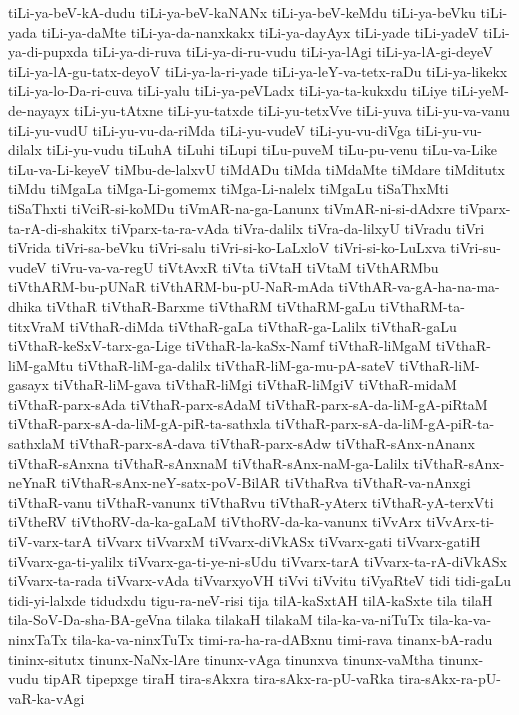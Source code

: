 {tiLi-ya-beV-kA-dudu
tiLi-ya-beV-kaNANx
tiLi-ya-beV-keMdu
tiLi-ya-beVku
tiLi-yada
tiLi-ya-daMte
tiLi-ya-da-nanxkakx
tiLi-ya-dayAyx
tiLi-yade
tiLi-yadeV
tiLi-ya-di-pupxda
tiLi-ya-di-ruva
tiLi-ya-di-ru-vudu
tiLi-ya-lAgi
tiLi-ya-lA-gi-deyeV
tiLi-ya-lA-gu-tatx-deyoV
tiLi-ya-la-ri-yade
tiLi-ya-leY-va-tetx-raDu
tiLi-ya-likekx
tiLi-ya-lo-Da-ri-cuva
tiLi-yalu
tiLi-ya-peVLadx
tiLi-ya-ta-kukxdu
tiLiye
tiLi-yeM-de-nayayx
tiLi-yu-tAtxne
tiLi-yu-tatxde
tiLi-yu-tetxVve
tiLi-yuva
tiLi-yu-va-vanu
tiLi-yu-vudU
tiLi-yu-vu-da-riMda
tiLi-yu-vudeV
tiLi-yu-vu-diVga
tiLi-yu-vu-dilalx
tiLi-yu-vudu
tiLuhA
tiLuhi
tiLupi
tiLu-puveM
tiLu-pu-venu
tiLu-va-Like
tiLu-va-Li-keyeV
tiMbu-de-lalxvU
tiMdADu
tiMda
tiMdaMte
tiMdare
tiMditutx
tiMdu
tiMgaLa
tiMga-Li-gomemx
tiMga-Li-nalelx
tiMgaLu
tiSaThxMti
tiSaThxti
tiVciR-si-koMDu
tiVmAR-na-ga-Lanunx
tiVmAR-ni-si-dAdxre
tiVparx-ta-rA-di-shakitx
tiVparx-ta-ra-vAda
tiVra-dalilx
tiVra-da-lilxyU
tiVradu
tiVri
tiVrida
tiVri-sa-beVku
tiVri-salu
tiVri-si-ko-LaLxloV
tiVri-si-ko-LuLxva
tiVri-su-vudeV
tiVru-va-va-regU
tiVtAvxR
tiVta
tiVtaH
tiVtaM
tiVthARMbu
tiVthARM-bu-pUNaR
tiVthARM-bu-pU-NaR-mAda
tiVthAR-va-gA-ha-na-ma-dhika
tiVthaR
tiVthaR-Barxme
tiVthaRM
tiVthaRM-gaLu
tiVthaRM-ta-titxVraM
tiVthaR-diMda
tiVthaR-gaLa
tiVthaR-ga-Lalilx
tiVthaR-gaLu
tiVthaR-keSxV-tarx-ga-Lige
tiVthaR-la-kaSx-Namf
tiVthaR-liMgaM
tiVthaR-liM-gaMtu
tiVthaR-liM-ga-dalilx
tiVthaR-liM-ga-mu-pA-sateV
tiVthaR-liM-gasayx
tiVthaR-liM-gava
tiVthaR-liMgi
tiVthaR-liMgiV
tiVthaR-midaM
tiVthaR-parx-sAda
tiVthaR-parx-sAdaM
tiVthaR-parx-sA-da-liM-gA-piRtaM
tiVthaR-parx-sA-da-liM-gA-piR-ta-sathxla
tiVthaR-parx-sA-da-liM-gA-piR-ta-sathxlaM
tiVthaR-parx-sA-dava
tiVthaR-parx-sAdw
tiVthaR-sAnx-nAnanx
tiVthaR-sAnxna
tiVthaR-sAnxnaM
tiVthaR-sAnx-naM-ga-Lalilx
tiVthaR-sAnx-neYnaR
tiVthaR-sAnx-neY-satx-poV-BilAR
tiVthaRva
tiVthaR-va-nAnxgi
tiVthaR-vanu
tiVthaR-vanunx
tiVthaRvu
tiVthaR-yAterx
tiVthaR-yA-terxVti
tiVtheRV
tiVthoRV-da-ka-gaLaM
tiVthoRV-da-ka-vanunx
tiVvArx
tiVvArx-ti-tiV-varx-tarA
tiVvarx
tiVvarxM
tiVvarx-diVkASx
tiVvarx-gati
tiVvarx-gatiH
tiVvarx-ga-ti-yalilx
tiVvarx-ga-ti-ye-ni-sUdu
tiVvarx-tarA
tiVvarx-ta-rA-diVkASx
tiVvarx-ta-rada
tiVvarx-vAda
tiVvarxyoVH
tiVvi
tiVvitu
tiVyaRteV
tidi
tidi-gaLu
tidi-yi-lalxde
tidudxdu
tigu-ra-neV-risi
tija
tilA-kaSxtAH
tilA-kaSxte
tila
tilaH
tila-SoV-Da-sha-BA-geVna
tilaka
tilakaH
tilakaM
tila-ka-va-niTuTx
tila-ka-va-ninxTaTx
tila-ka-va-ninxTuTx
timi-ra-ha-ra-dABxnu
timi-rava
tinanx-bA-radu
tininx-situtx
tinunx-NaNx-lAre
tinunx-vAga
tinunxva
tinunx-vaMtha
tinunx-vudu
tipAR
tipepxge
tiraH
tira-sAkxra
tira-sAkx-ra-pU-vaRka
tira-sAkx-ra-pU-vaR-ka-vAgi
}
